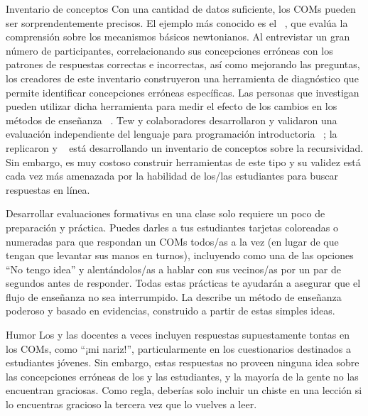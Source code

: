 \begin{aside}{Inventario de conceptos}
Con una cantidad de datos suficiente,
los COMs pueden ser sorprendentemente precisos.
El ejemplo más conocido es el
  ~\cite{Hest1992},
que evalúa la comprensión sobre los mecanismos básicos newtonianos.
Al entrevistar un gran número de participantes,
correlacionando sus concepciones erróneas con los patrones de respuestas correctas e incorrectas,
así como mejorando las preguntas,
los creadores de este inventario construyeron una herramienta de diagnóstico que permite identificar concepciones erróneas específicas.
Las personas  que investigan pueden utilizar dicha herramienta para medir el efecto de los cambios en los métodos de enseñanza ~\cite{Hake1998}.
Tew y colaboradores desarrollaron y validaron una evaluación independiente del lenguaje para programación introductoria ~\cite{Tew2011};  \cite{Park2016} la replicaron y ~\cite{Hamo2017} está desarrollando un inventario de conceptos sobre la recursividad.
Sin embargo,
es muy costoso construir herramientas de este tipo
y su validez está cada vez más amenazada por la habilidad de los/las estudiantes para buscar respuestas en línea.
\end{aside}

Desarrollar evaluaciones formativas en una clase solo requiere un poco de preparación y práctica.
Puedes darles a tus estudiantes tarjetas coloreadas o numeradas para que respondan un COMs todos/as a la vez (en lugar de que tengan que levantar sus manos en turnos), incluyendo como una de las opciones ``No tengo idea''
y alentándolos/as a hablar con sus vecinos/as por un par de segundos antes de responder. Todas estas prácticas te ayudarán a asegurar que el flujo de enseñanza no sea interrumpido.
La  describe un método de enseñanza poderoso y basado en evidencias, construido a partir de estas simples ideas. 

\begin{aside}{Humor}
Los y las docentes a veces incluyen respuestas supuestamente tontas en los COMs, como ``¡mi nariz!'', particularmente en los cuestionarios destinados a estudiantes jóvenes.
Sin embargo,
estas respuestas no proveen ninguna idea sobre las concepciones erróneas de los y las estudiantes, y la mayoría de la gente no las encuentran graciosas.
Como regla,
deberías solo incluir un chiste en una lección si lo encuentras gracioso la tercera vez que lo vuelves a leer.
\end{aside}

